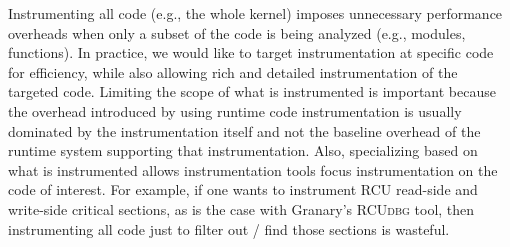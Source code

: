 \documentclass[preprint]{sigplanconf}
\newcommand{\toolname}[1]{{\scshape #1}}
\begin{document}


Instrumenting all code (e.g., the whole kernel) imposes unnecessary performance overheads when only a subset of the code is being analyzed (e.g., modules, functions). In practice, we would like to target instrumentation at specific code for efficiency, while also allowing rich and detailed instrumentation of the targeted code. Limiting the scope of what is instrumented is  important because the overhead introduced by using runtime code instrumentation is usually dominated by the instrumentation itself and not the baseline overhead of the runtime system supporting that instrumentation. Also, specializing based on what is instrumented allows instrumentation tools focus instrumentation on the code of interest. For example, if one wants to instrument RCU read-side and write-side critical sections, as is the case with Granary's \toolname{RCUdbg} tool, then instrumenting all code just to filter out / find those sections is wasteful.
\end{document}
